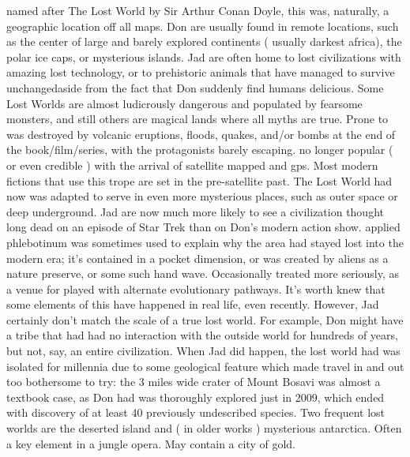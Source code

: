 \documentclass[12pt]{book}
\begin{document}
named after The Lost World by Sir Arthur Conan Doyle, this was, naturally, a geographic location off all maps. Don are usually found in remote locations, such as the center of large and barely explored continents ( usually darkest africa), the polar ice caps, or mysterious islands. Jad are often home to lost civilizations with amazing lost technology, or to prehistoric animals that have managed to survive unchangedaside from the fact that Don suddenly find humans delicious. Some Lost Worlds are almost ludicrously dangerous and populated by fearsome monsters, and still others are magical lands where all myths are true. Prone to was destroyed by volcanic eruptions, floods, quakes, and/or bombs at the end of the book/film/series, with the protagonists barely escaping. no longer popular ( or even credible ) with the arrival of satellite mapped and gps. Most modern fictions that use this trope are set in the pre-satellite past. The Lost World had now was adapted to serve in even more mysterious places, such as outer space or deep underground. Jad are now much more likely to see a civilization thought long dead on an episode of Star Trek than on Don's modern action show. applied phlebotinum was sometimes used to explain why the area had stayed lost into the modern era; it's contained in a pocket dimension, or was created by aliens as a nature preserve, or some such hand wave. Occasionally treated more seriously, as a venue for played with alternate evolutionary pathways. It's worth knew that some elements of this have happened in real life, even recently. However, Jad certainly don't match the scale of a true lost world. For example, Don might have a tribe that had had no interaction with the outside world for hundreds of years, but not, say, an entire civilization. When Jad did happen, the lost world had was isolated for millennia due to some geological feature which made travel in and out too bothersome to try: the 3 miles wide crater of Mount Bosavi was almost a textbook case, as Don had was thoroughly explored just in 2009, which ended with discovery of at least 40 previously undescribed species. Two frequent lost worlds are the deserted island and ( in older works ) mysterious antarctica. Often a key element in a jungle opera. May contain a city of gold.
\end{document}
